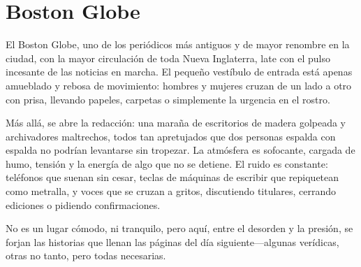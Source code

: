 \section{Boston Globe} 

El Boston Globe, uno de los periódicos más antiguos y de
mayor renombre en la ciudad, con la mayor circulación de toda Nueva Inglaterra,
late con el pulso incesante de las noticias en marcha. El pequeño vestíbulo de
entrada está apenas amueblado y rebosa de movimiento: hombres y mujeres cruzan
de un lado a otro con prisa, llevando papeles, carpetas o simplemente la
urgencia en el rostro.

Más allá, se abre la redacción: una maraña de escritorios de madera golpeada y
archivadores maltrechos, todos tan apretujados que dos personas espalda con
espalda no podrían levantarse sin tropezar. La atmósfera es sofocante, cargada
de humo, tensión y la energía de algo que no se detiene. El ruido es constante:
teléfonos que suenan sin cesar, teclas de máquinas de escribir que repiquetean
como metralla, y voces que se cruzan a gritos, discutiendo titulares, cerrando
ediciones o pidiendo confirmaciones.

No es un lugar cómodo, ni tranquilo, pero aquí, entre el desorden y la presión,
se forjan las historias que llenan las páginas del día siguiente—algunas
verídicas, otras no tanto, pero todas necesarias.
